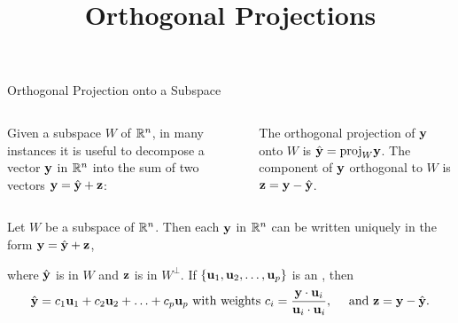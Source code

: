 \documentclass[xcolor=dvipsnames,aspectratio=169,t]{beamer}
\title{Orthogonal Projections}
\begin{document}
\maketitle

\begin{frame}{Orthogonal Projection onto a Subspace}
  \medskip

  \begin{columns}[T]
  \column{0.7\tw}
  Given a subspace $W$ of $\mathbb{R}^n$, in many instances it is useful to decompose a vector $\mathbf{y}$ in $\mathbb{R}^n$ into the sum of two vectors $\mathbf{y} = \hat{\mathbf{y}} + \mathbf{z}$:%
  \medskip
  
  \bi
  \ii  The \alert{orthogonal projection of $\mathbf{y}$ onto $W$} is $\hat{\mathbf{y}}=\mbox{proj}_W \mathbf{y}$.
  \smallskip
  \ii The \alert{component of $\mathbf{y}$ orthogonal to $W$} is $\mathbf{z} = \mathbf{y} - \hat{\mathbf{y}}$.
  \ei

  \column{0.3\tw}
  \scalebox{.85}{}
  \end{columns}
  \bigskip

  \pause
  \begin{theorem}
  Let $W$ be a subspace of $\mathbb{R}^n$.
  Then each $\mathbf{y}$ in $\mathbb{R}^n$ can be written \alert{uniquely} in the form  $\mathbf{y} = \hat{\mathbf{y}} + \mathbf{z}$,
  \smallskip
  
  where $\hat{\mathbf{y}}$ is in $W$ and $\mathbf{z}$ is in $W^{\perp}$.
  If $\left\{ \mathbf{u}_1, \mathbf{u}_2, \ldots , \mathbf{u}_p \right\}$ is an , then
  \[ \hat{\mathbf{y}} = c_1 \mathbf{u}_1 + c_2 \mathbf{u}_2 + \ldots + c_p \mathbf{u}_p \mbox{ with weights } c_i = \frac{\mathbf{y} \cdot \mathbf{u}_i}{\mathbf{u}_i \cdot \mathbf{u}_i}, \quad \mbox{ and } \mathbf{z} = \mathbf{y} - \hat{\mathbf{y}}.\]
  \end{theorem}
\end{frame}
\end{document}
